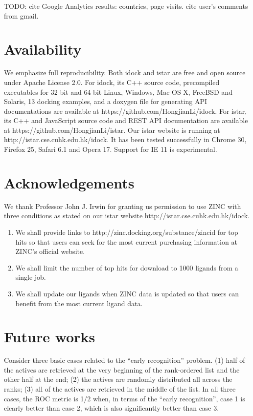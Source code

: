 TODO: cite Google Analytics results: countries, page visits. cite user's comments from gmail.

\section{Availability}

We emphasize full reproducibility. Both idock and istar are free and open source under Apache License 2.0. For idock, its C++ source code, precompiled executables for 32-bit and 64-bit Linux, Windows, Mac OS X, FreeBSD and Solaris, 13 docking examples, and a doxygen file for generating API documentations are available at https://github.com/HongjianLi/idock. For istar, its C++ and JavaScript source code and REST API documentation are available at https://github.com/HongjianLi/istar. Our istar website is running at http://istar.cse.cuhk.edu.hk/idock. It has been tested successfully in Chrome 30, Firefox 25, Safari 6.1 and Opera 17. Support for IE 11 is experimental.

\section{Acknowledgements}

We thank Professor John J. Irwin for granting us permission to use ZINC \citep{532,1178} with three conditions as stated on our istar website http://istar.cse.cuhk.edu.hk/idock.
\begin{enumerate}
\item We shall provide links to http://zinc.docking.org/substance/zincid for top hits so that users can seek for the most current purchasing information at ZINC's official website.
\item We shall limit the number of top hits for download to 1000 ligands from a single job.
\item We shall update our ligands when ZINC data is updated so that users can benefit from the most current ligand data.
\end{enumerate}

\section{Future works}

Consider three basic cases related to the “early recognition” problem. (1) half of the actives are retrieved at the very beginning of the rank-ordered list and the other half at the end; (2) the actives are randomly distributed all across the ranks; (3) all of the actives are retrieved in the middle of the list. In all three cases, the ROC metric is 1/2 when, in terms of the “early recognition”, case 1 is clearly better than case 2, which is also significantly better than case 3.

